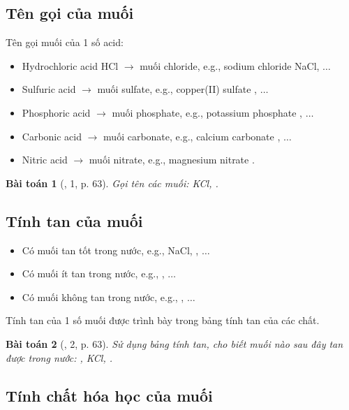 \documentclass{article}
\newtheorem{baitoan}{Bài toán}
\begin{document}
\subsection{Tên gọi của muối}
Tên gọi muối của 1 số acid:
\begin{itemize}
	\item Hydrochloric acid HCl $\to$ muối chloride, e.g., sodium chloride NaCl, $\ldots$
	\item Sulfuric acid  $\to$ muối sulfate, e.g., copper(II) sulfate , $\ldots$
	\item Phosphoric acid  $\to$ muối phosphate, e.g., potassium phosphate , $\ldots$
	\item Carbonic acid  $\to$ muối carbonate, e.g., calcium carbonate , $\ldots$
	\item Nitric acid  $\to$ muối nitrate, e.g., magnesium nitrate .
\end{itemize}

\begin{baitoan}[\cite{SGK_KHTN_8_Canh_Dieu}, 1, p. 63]
	Gọi tên các muối: \emph{KCl, }.
\end{baitoan}

\subsection{Tính tan của muối}
\begin{itemize}
	\item Có muối tan tốt trong nước, e.g., NaCl, , $\ldots$
	\item Có muối ít tan trong nước, e.g., , $\ldots$
	\item Có muối không tan trong nước, e.g., , $\ldots$
\end{itemize}
Tính tan của 1 số muối được trình bày trong bảng tính tan của các chất.

\begin{baitoan}[\cite{SGK_KHTN_8_Canh_Dieu}, 2, p. 63]
	Sử dụng bảng tính tan, cho biết muối nào sau đây tan được trong nước: \emph{, KCl, }.
\end{baitoan}

\subsection{Tính chất hóa học của muối}
\end{document}
